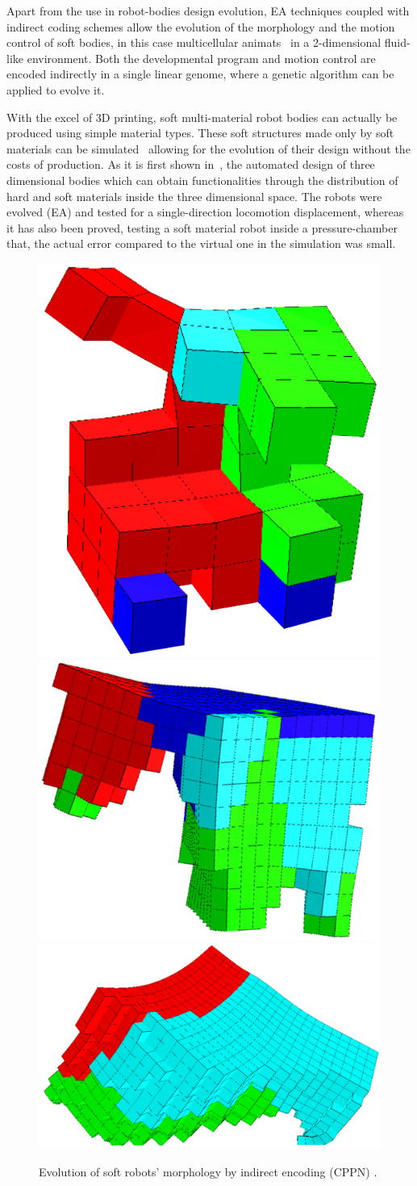 Apart from the use in robot-bodies design evolution, EA techniques coupled with indirect coding schemes allow the evolution of the morphology and the motion control of soft bodies, in this case  multicellular animats~\cite{joachimczak2012co} in a 2-dimensional fluid-like environment. Both the developmental program and motion control are encoded indirectly in a single linear genome, where a genetic algorithm can be applied to evolve it.

With the excel of $3$D printing, soft multi-material robot bodies can actually be produced using simple material types. These soft structures made only by soft materials can be simulated~\cite{hiller2012dynamic} allowing for the evolution of their design without the costs of production. As it is first shown in~\cite{hiller2012automatic}, the automated design of three dimensional bodies which can obtain functionalities through the distribution of hard and soft materials inside the three dimensional space. The robots were evolved (EA) and tested for a single-direction locomotion displacement, whereas it has also been proved, testing a soft material robot inside a pressure-chamber that, the actual error compared to the virtual one in the simulation was small.

\begin{figure}[t!]
\centering
\includegraphics[height=0.2\textwidth]{../Figures/Misc/unshacklingEvolutionFigure1.png}\hspace{0.4cm}
\includegraphics[height=0.2\textwidth]{../Figures/Misc/unshacklingEvolutionFigure2.png}\hspace{0.4cm}
\includegraphics[height=0.2\textwidth]{../Figures/Misc/unshacklingEvolutionFigure3.png}
\caption{Evolution of soft robots' morphology by indirect encoding (CPPN) \cite{cheney2013unshackling}.}
\label{fig:unschackling}
\end{figure}

